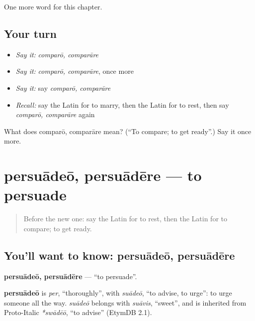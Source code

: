 \begin{grammarlens}[title={What you've built}]
One more word for this chapter.
\end{grammarlens}

\subsection*{Your turn}
\begin{itemize}
\raggedright
  \item \emph{Say it:} \emph{comparō, comparāre}
  \item \emph{Say it:} \emph{comparō, comparāre}, once more
  \item \emph{Say it:} say \emph{comparō, comparāre}
  \item \emph{Recall:} say the Latin for to marry, then the Latin for to rest, then say \emph{comparō, comparāre} again
\end{itemize}

\begin{tcolorbox}[breakable,colback=teal!4,colframe=teal!35!black,title={Before you move on}]
What does comparō, comparāre mean? (\textquotedblleft{}To compare; to get ready\textquotedblright{}.) Say it once more.
\end{tcolorbox}
\section[persuādeō, persuādēre]{persuādeō, persuādēre — to persuade}

\label{lesson:LA-C199-persuadeo}



\begin{quote}
Before the new one: say the Latin for to rest, then the Latin for to compare; to get ready.
\end{quote}

\subsection*{You'll want to know: persuādeō, persuādēre}
\textbf{persuādeō, persuādēre} — \textquotedblleft{}to persuade\textquotedblright{}.

\begin{cousinweb}
\textbf{persuādeō} is \emph{per}, \textquotedblleft{}thoroughly\textquotedblright{}, with \emph{suādeō}, \textquotedblleft{}to advise, to urge\textquotedblright{}: to urge someone all the way. \emph{suādeō} belongs with \emph{suāvis}, \textquotedblleft{}sweet\textquotedblright{}, and is inherited from Proto-Italic \emph{*swādēō}, \textquotedblleft{}to advise\textquotedblright{} (EtymDB 2.1).
\end{cousinweb}


